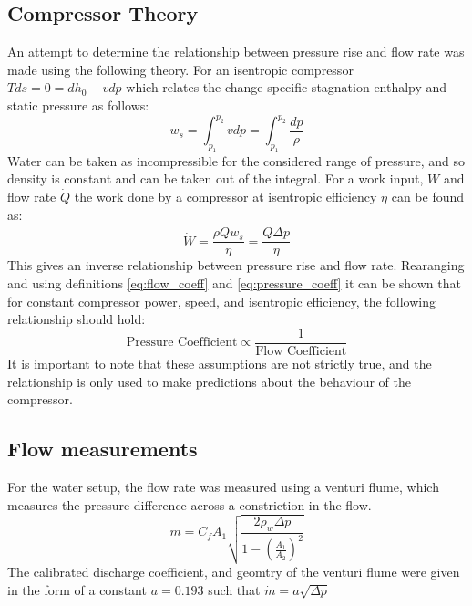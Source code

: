 \documentclass{article}
\begin{document}
\subsection{Compressor Theory}

An attempt to determine the relationship between pressure rise and flow rate was made using the following theory.
For an isentropic compressor $Tds = 0 = dh_0 - vdp$ which relates the change specific stagnation enthalpy and static pressure as follows:
\begin{equation}
    w_s = \int_{p_1}^{p_2} vdp = \int_{p_1}^{p_2} \frac{dp}{\rho}
\end{equation}
Water can be taken as incompressible for the considered range of pressure, and so density is constant and can be taken out of the integral.
For a work input, $\dot{W}$ and flow rate $\dot{Q}$ the work done by a compressor at isentropic efficiency $\eta$ can be found as:
\begin{equation}
    \dot{W} = \frac{\rho \dot{Q} w_s}{\eta} = \frac{\dot{Q} \Delta p}{\eta} 
\end{equation}
This gives an inverse relationship between pressure rise and flow rate.
Rearanging and using definitions \ref{eq:flow_coeff} and \ref{eq:pressure_coeff} it can be shown that for constant compressor power, speed, and isentropic efficiency, the following relationship should hold:
\begin{equation}
    \text{Pressure Coefficient} \propto \frac{1}{\text{Flow Coefficient}} \label{eq:inverse_relationship}
\end{equation}
It is important to note that these assumptions are not strictly true, and the relationship is only used to make predictions about the behaviour of the compressor.

\subsection{Flow measurements}

For the water setup, the flow rate was measured using a venturi flume, which measures the pressure difference across a constriction in the flow.
\begin{equation}
    \dot{m} = C_f A_1 \sqrt{\frac{2\rho_w \Delta p}{1 - \left( \frac{A_1}{A_2} \right)^2}} \label{eq:venturi_flume}
\end{equation}
The calibrated discharge coefficient, and geomtry of the venturi flume were given in the form of a constant $a=0.193$ such that $\dot{m}=a \sqrt{\Delta p}$
\end{document}
